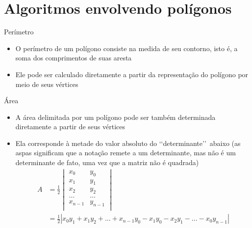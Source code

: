 \section{Algoritmos envolvendo polígonos}

\begin{frame}[fragile]{Perímetro}

    \begin{itemize}
        \item O perímetro de um polígono consiste na medida de seu contorno, isto é, a soma dos 
            comprimentos de suas aresta

        \item Ele pode ser calculado diretamente a partir da representação do polígono por meio
            de seus vértices
    \end{itemize}

\end{frame}

\begin{frame}[fragile]{Área}

    \begin{itemize}
        \item A área delimitada por um polígono pode ser também determinada diretamente a partir
            de seus vértices

        \item Ela corresponde à metade do valor absoluto do \lq \lq determinante\rq\rq\ abaixo (as 
            aspas significam que a notação remete a um determinante, mas não é um determinante de 
                fato, uma vez que a matriz não é quadrada)
        \begin{align*}
            A &= \frac{1}{2}\begin{vmatrix}
                x_0 & y_0 \\
                x_1 & y_1 \\
                x_2 & y_2 \\
                \ldots & \ldots \\
                x_{n-1} & y_{n-1} \\
            \end{vmatrix} \\
            & = \frac{1}{2}|x_0y_1 + x_1y_2 + \ldots + x_{n-1}y_0 - x_1y_0 - x_2y_1 - \ldots - x_0y_{n-1}|
        \end{align*}
    \end{itemize}

\end{frame}


